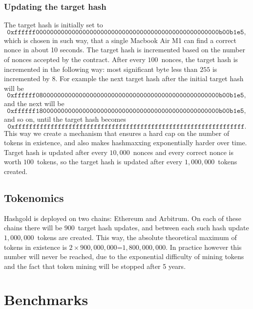 \documentclass[12pt, a4paper]{article}
\newcommand{\incrementPeriodNonces}{$10,000$}
\newcommand{\rewardPerNonce}{$100$}
\newcommand{\tokensPerHashUpdate}{$1,000,000$}
\newcommand{\totalNumberofIncremensPerChain}{$900$}
\newcommand{\tokenHardCapPerChain}{$900,000,000$}
\newcommand{\tokenHardCapTotal}{$1,800,000,000$}
\newcommand{\tokenMiningStopped}{5 years}
\begin{document}
\subsubsection{Updating the target hash}
The target hash is initially set to
\begin{equation*}
\texttt{0xffffff000000000000000000000000000000000000000000000000000b00b1e5},
\end{equation*}
which is chosen in such way, that a single Macbook Air M1 can find a correct nonce in about 10 seconds. The target hash is incremented based on the number of nonces accepted by the contract. After every \rewardPerNonce~nonces, the target hash is incremented in the following way: most significant byte less than $255$ is incremented by $8$. For example the next target hash after the initial target hash will be
\begin{equation*}
\texttt{0xffffff080000000000000000000000000000000000000000000000000b00b1e5},
\end{equation*}
and the next will be
\begin{equation*}
\texttt{0xffffff180000000000000000000000000000000000000000000000000b00b1e5},
\end{equation*}
and so on, until the target hash becomes
\begin{equation*}
\texttt{0xffffffffffffffffffffffffffffffffffffffffffffffffffffffffffffffff}.
\end{equation*}
This way we create a mechanism that ensures a hard cap on the number of tokens in existence, and also makes hashmaxxing exponentially harder over time. Target hash is updated after every \incrementPeriodNonces~nonces and every correct nonce is worth \rewardPerNonce~tokens, so the target hash is updated after every
\tokensPerHashUpdate~tokens created.
\subsection{Tokenomics}
Hashgold is deployed on two chains: Ethereum and Arbitrum. On each of these chains there will be \totalNumberofIncremensPerChain~target hash updates, and between each such hash update \tokensPerHashUpdate~tokens are created. 
This way, the absolute theoretical maximum of tokens in existence is $2\times$\tokenHardCapPerChain=\tokenHardCapTotal. In practice however this number will never be reached, due to the exponential difficulty of mining tokens and the fact that token mining will be stopped after \tokenMiningStopped.

\newpage
\section{Benchmarks}
\end{document}
